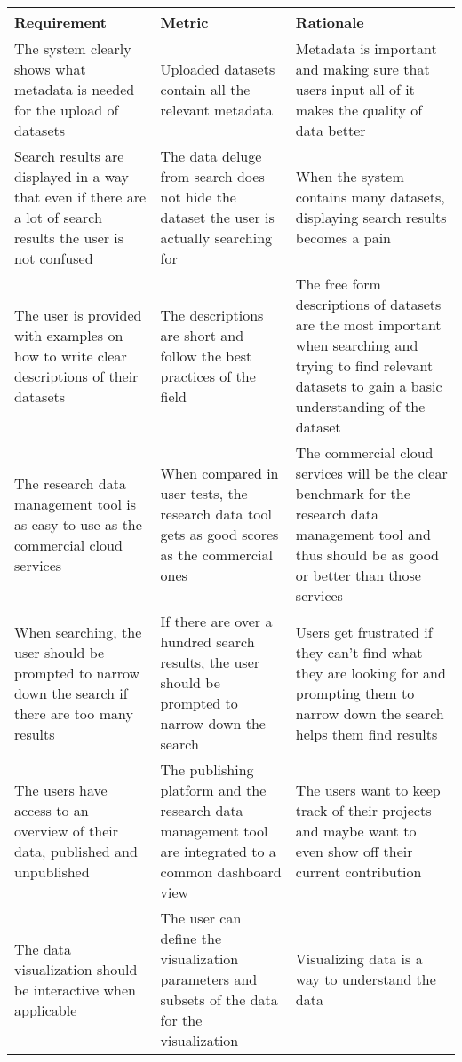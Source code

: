 \tabcolsep=0.11cm
\begin{tabularx}{\textwidth}{| >{\raggedright}p{3cm} | >{\raggedright}p{3cm} | X |}
    \hline
    \textbf{Requirement} & \textbf{Metric}& \textbf{Rationale} \\
    \hline
    \rowcolor{Gray}
    The system clearly shows what metadata is needed for the upload of datasets   &Uploaded datasets contain all the relevant metadata& Metadata is important and making sure that users input all of it makes the quality of data better\\
    \hline
    Search results are displayed in a way that even if there are a lot of search results the user is not confused&The data deluge from search does not hide the dataset the user is actually searching for &When the system contains many datasets, displaying search results becomes a pain\\
    \hline
    \rowcolor{Gray}
    The user is provided with examples on how to write clear descriptions of their datasets &The descriptions are short and follow the best practices of the field&The free form descriptions of datasets are the most important when searching and trying to find relevant datasets to gain a basic understanding of the dataset\\
    \hline
    The research data management tool is as easy to use as the commercial cloud services &When compared in user tests, the research data tool gets as good scores as the commercial ones & The commercial cloud services will be the clear benchmark for the research data management tool and thus should be as good or better than those services\\
    \hline
    \rowcolor{Gray}
    When searching, the user should be prompted to narrow down the search if there are too many results    &If there are over a hundred search results, the user should be prompted to narrow down the search & Users get frustrated if they can’t find what they are looking for and prompting them to narrow down the search helps them find results\\
    \hline
    The users have access to an overview of their data, published and unpublished& The publishing platform and the research data management tool are integrated to a common dashboard view & The users want to keep track of their projects and maybe want to even show off their current contribution\\
    \hline
    \rowcolor{Gray}
    The data visualization should be interactive when applicable  &The user can define the visualization parameters and subsets of the data for the visualization& Visualizing data is a way to understand the data\\

\end{tabularx}
